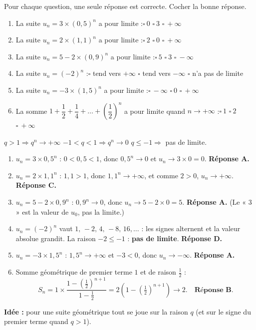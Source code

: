 
Pour chaque question, une seule réponse est correcte. Cocher la bonne réponse.

\begin{enumerate}
  \item La suite $u_n=3\times(0{,}5)^n$ a pour limite :\quad $\square\ 0$ \qquad $\square\ 3$ \qquad $\square\ +\infty$
  \item La suite $u_n=2\times(1{,}1)^n$ a pour limite :\quad $\square\ 2$ \qquad $\square\ 0$ \qquad $\square\ +\infty$
  \item La suite $u_n=5-2\times(0{,}9)^n$ a pour limite :\quad $\square\ 5$ \qquad $\square\ 3$ \qquad $\square\ -\infty$
  \item La suite $u_n=(-2)^n$ :\quad $\square$ tend vers $+\infty$ \qquad $\square$ tend vers $-\infty$ \qquad $\square$ n'a pas de limite
  \item La suite $u_n=-3\times(1{,}5)^n$ a pour limite :\quad $\square\ -\infty$ \qquad $\square\ 0$ \qquad $\square\ +\infty$
  \item La somme $1+\dfrac12+\dfrac14+\dots+\left(\dfrac12\right)^n$ a pour limite quand $n\to+\infty$ :\quad $\square\ 1$ \qquad $\square\ 2$ \qquad $\square\ +\infty$
\end{enumerate}

\begin{prop}[Limite de $q^n$]
$q>1\Rightarrow q^n\to+\infty$ \quad $-1<q<1\Rightarrow q^n\to0$ \quad $q\le-1\Rightarrow$ pas de limite.
\end{prop}
\begin{enumerate}
  \item $u_n=3\times0{,}5^n$ : $0<0{,}5<1$, donc $0{,}5^n\to0$ et $u_n\to3\times0=0$. \textbf{Réponse A.}
  \item $u_n=2\times1{,}1^n$ : $1{,}1>1$, donc $1{,}1^n\to+\infty$, et comme $2>0$, $u_n\to+\infty$. \textbf{Réponse C.}
  \item $u_n=5-2\times0{,}9^n$ : $0{,}9^n\to0$, donc $u_n\to5-2\times0=5$. \textbf{Réponse A.} (Le « $3$ » est la valeur de $u_0$, pas la limite.)
  \item $u_n=(-2)^n$ vaut $1,\,-2,\,4,\,-8,\,16,\dots$ : les signes alternent et la valeur absolue grandit. La raison $-2\le-1$ : \textbf{pas de limite}. \textbf{Réponse D.}
  \item $u_n=-3\times1{,}5^n$ : $1{,}5^n\to+\infty$ et $-3<0$, donc $u_n\to-\infty$. \textbf{Réponse A.}
  \item Somme géométrique de premier terme $1$ et de raison $\frac12$ :
  $$S_n=1\times\frac{1-\left(\frac12\right)^{n+1}}{1-\frac12}=2\left(1-\left(\tfrac12\right)^{n+1}\right)\longrightarrow2.\quad\textbf{Réponse B.}$$
\end{enumerate}

\textbf{Idée :} pour une suite géométrique tout se joue sur la raison $q$ (et sur le signe du premier terme quand $q>1$).
